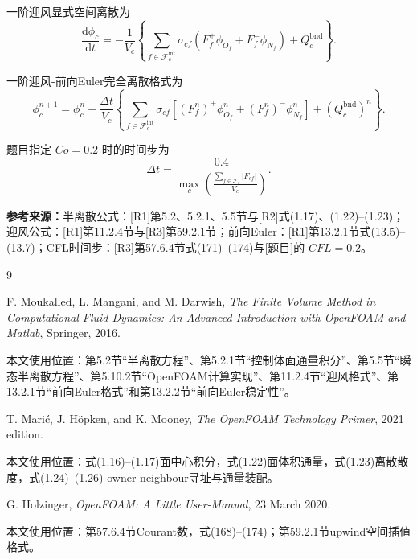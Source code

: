 \documentclass[UTF8,12pt,a4paper]{ctexart}
\numberwithin{equation}{section}
\newcommand{\Rone}{\textnormal{[R1]}}
\newcommand{\Rtwo}{\textnormal{[R2]}}
\newcommand{\Rthree}{\textnormal{[R3]}}
\newcommand{\Task}{\textnormal{[题目]}}
\newcommand{\source}[1]{%
  \par\smallskip
  \noindent\colorbox{sourcebg}{%
    \parbox{0.955\linewidth}{\footnotesize\color{sourcegray}\textbf{参考来源：}#1}%
  }
  \par\smallskip
}
\begin{document}
一阶迎风显式空间离散为
\begin{equation}
  \boxed{
  \frac{\mathrm d\phi_c}{\mathrm dt}
  =-\frac{1}{V_c}
  \left\{
  \sum_{f\in\mathcal F_c^{\mathrm{int}}}
  \sigma_{cf}
  \left(F_f^+\phi_{O_f}+F_f^-\phi_{N_f}\right)
  +Q_c^{\mathrm{bnd}}
  \right\}
  }.
\end{equation}

一阶迎风-前向Euler完全离散格式为
\begin{equation}
  \boxed{
  \phi_c^{n+1}
  =\phi_c^n
  -\frac{\Delta t}{V_c}
  \left\{
  \sum_{f\in\mathcal F_c^{\mathrm{int}}}
  \sigma_{cf}
  \left[(F_f^n)^+\phi_{O_f}^n
  +(F_f^n)^-\phi_{N_f}^n\right]
  +(Q_c^{\mathrm{bnd}})^n
  \right\}
  }.
\end{equation}

题目指定 $Co=0.2$ 时的时间步为
\begin{equation}
  \boxed{
  \Delta t
  =\frac{0.4}{
    \displaystyle
    \max_c\left(
      \frac{\sum_{f\in\mathcal F_c}|F_{cf}|}{V_c}
    \right)}
  }.
\end{equation}

\source{半离散公式：\Rone 第5.2、5.2.1、5.5节与\Rtwo 式(1.17)、(1.22)--(1.23)；迎风公式：\Rone 第11.2.4节与\Rthree 第59.2.1节；前向Euler：\Rone 第13.2.1节式(13.5)--(13.7)；CFL时间步：\Rthree 第57.6.4节式(171)--(174)与\Task 的 $CFL=0.2$。}

\newpage
\begin{thebibliography}{9}

F. Moukalled, L. Mangani, and M. Darwish,
\textit{The Finite Volume Method in Computational Fluid Dynamics: An Advanced Introduction with OpenFOAM and Matlab},
Springer, 2016.

本文使用位置：第5.2节“半离散方程”、第5.2.1节“控制体面通量积分”、第5.5节“瞬态半离散方程”、第5.10.2节“OpenFOAM计算实现”、第11.2.4节“迎风格式”、第13.2.1节“前向Euler格式”和第13.2.2节“前向Euler稳定性”。

T. Mari\'{c}, J. H\"opken, and K. Mooney,
\textit{The OpenFOAM Technology Primer}, 2021 edition.

本文使用位置：式(1.16)--(1.17)面中心积分，式(1.22)面体积通量，式(1.23)离散散度，式(1.24)--(1.26) owner-neighbour寻址与通量装配。

G. Holzinger,
\textit{OpenFOAM: A Little User-Manual},
23 March 2020.

本文使用位置：第57.6.4节Courant数，式(168)--(174)；第59.2.1节upwind空间插值格式。

\end{thebibliography}
\end{document}
